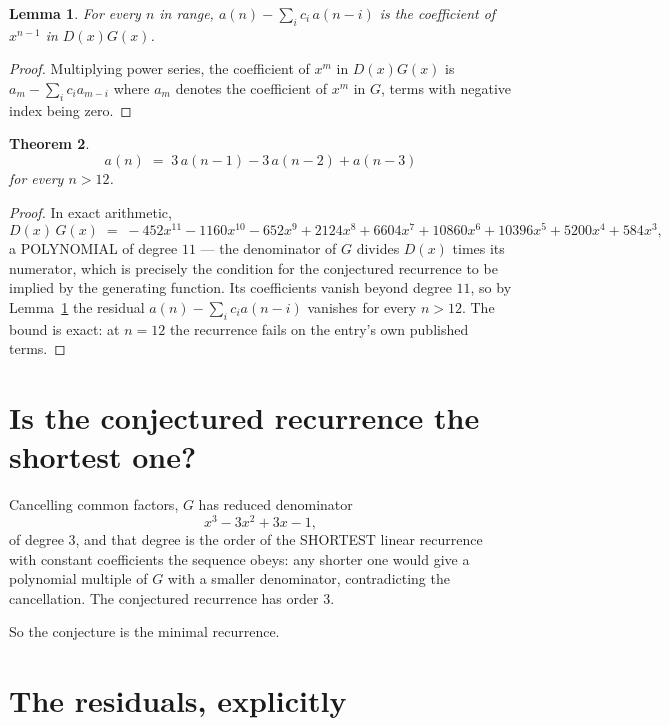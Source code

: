 \documentclass[11pt,a4paper]{article}
\theoremstyle{plain}
\newtheorem{theorem}{Theorem}
\newtheorem{lemma}[theorem]{Lemma}
\theoremstyle{definition}
\begin{document}
\begin{lemma}\label{lem:key}
For every $n$ in range, $a(n)-\sum_i c_i\,a(n-i)$ is the coefficient of $x^{n-1}$ in
$D(x)G(x)$.
\end{lemma}

\begin{proof}
Multiplying power series, the coefficient of $x^{m}$ in $D(x)G(x)$ is
$a_m-\sum_i c_i a_{m-i}$ where $a_m$ denotes the coefficient of $x^{m}$ in $G$, terms with
negative index being zero.
\end{proof}

\begin{theorem}
\[
a(n)\;=\;3\,a(n-1) - 3\,a(n-2) + a(n-3)
\]
for every $n>12$.
\end{theorem}

\begin{proof}
In exact arithmetic,
\[
D(x)\,G(x)\;=\;- 452 x^{11} - 1160 x^{10} - 652 x^{9} + 2124 x^{8} + 6604 x^{7} + 10860 x^{6} + 10396 x^{5} + 5200 x^{4} + 584 x^{3},
\]
a POLYNOMIAL of degree $11$ --- the denominator of $G$ divides $D(x)$ times its numerator,
which is precisely the condition for the conjectured recurrence to be implied by the
generating function. Its coefficients vanish beyond degree $11$, so by
Lemma~\ref{lem:key} the residual $a(n)-\sum_ic_ia(n-i)$ vanishes for every
$n>12$. The bound is exact: at $n=12$ the recurrence fails on the entry's own published terms.
\end{proof}

\section{Is the conjectured recurrence the shortest one?}

Cancelling common factors, $G$ has reduced denominator
\[
x^{3} - 3 x^{2} + 3 x - 1,
\]
of degree $3$, and that degree is the order of the SHORTEST linear recurrence with
constant coefficients the sequence obeys: any shorter one would give a polynomial multiple of
$G$ with a smaller denominator, contradicting the cancellation. The conjectured recurrence has
order $3$.

So the conjecture is the minimal recurrence.

\section{The residuals, explicitly}
\end{document}
